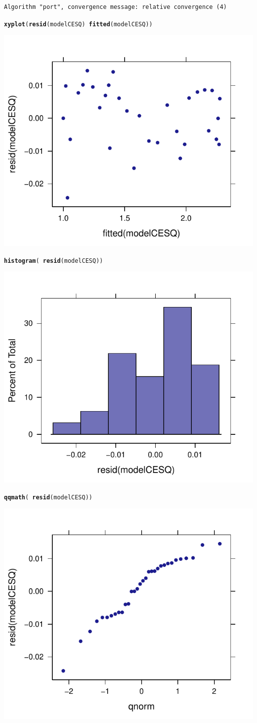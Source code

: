 \documentclass[10pt]{article}\usepackage{graphicx, color}
\makeatletter
\newcommand{\hlfunctioncall}[1]{\textcolor[rgb]{0.501960784313725,0,0.329411764705882}{\textbf{#1}}}%
\newenvironment{kframe}{%
 \def\at@end@of@kframe{}%
 \ifinner\ifhmode%
  \def\at@end@of@kframe{\end{minipage}}%
  \begin{minipage}{\columnwidth}%
 \fi\fi%
 \def\FrameCommand##1{\hskip\@totalleftmargin \hskip-\fboxsep
 \colorbox{shadecolor}{##1}\hskip-\fboxsep
     \hskip-\linewidth \hskip-\@totalleftmargin \hskip\columnwidth}%
 \MakeFramed {\advance\hsize-\width
   \@totalleftmargin\z@ \linewidth\hsize
   \@setminipage}}%
 {\par\unskip\endMakeFramed%
 \at@end@of@kframe}
\newenvironment{knitrout}{}{} %
\makeatother
\begin{document}
\begin{knitrout}
\begin{kframe}
\begin{verbatim}
Algorithm "port", convergence message: relative convergence (4) 
\end{verbatim}
\begin{alltt}
\hlfunctioncall{xyplot}( \hlfunctioncall{resid}(modelCESQ) ~ \hlfunctioncall{fitted}(modelCESQ) )
\end{alltt}
\end{kframe}
\includegraphics[width=.45\textwidth,height=.38\textwidth]{figure/unnamed-chunk-61} 
\begin{kframe}\begin{alltt}
\hlfunctioncall{histogram}( ~\hlfunctioncall{resid}(modelCESQ) )
\end{alltt}
\end{kframe}
\includegraphics[width=.45\textwidth,height=.38\textwidth]{figure/unnamed-chunk-62} 
\begin{kframe}\begin{alltt}
\hlfunctioncall{qqmath}( ~\hlfunctioncall{resid}(modelCESQ) )
\end{alltt}
\end{kframe}
\includegraphics[width=.45\textwidth,height=.38\textwidth]{figure/unnamed-chunk-63} 

\end{knitrout}
\end{document}
